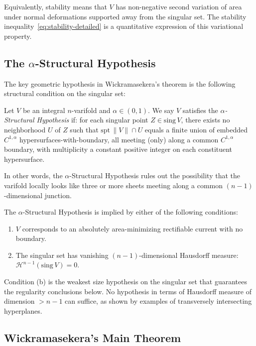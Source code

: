 Equivalently, stability means that $V$ has non-negative second variation of area under normal
deformations supported away from the singular set. The stability inequality~\eqref{eq:stability-detailed}
is a quantitative expression of this variational property.

\subsection{The $\alpha$-Structural Hypothesis}

The key geometric hypothesis in Wickramasekera's theorem is the following structural condition on
the singular set:

\begin{definition}\label{def:alpha-structural}
Let $V$ be an integral $n$-varifold and $\alpha \in (0,1)$. We say $V$ satisfies the
\emph{$\alpha$-Structural Hypothesis} if: for each singular point $Z \in \mathrm{sing}\, V$, there
exists no neighborhood $U$ of $Z$ such that $\mathrm{spt}\,\|V\| \cap U$ equals a finite union of
embedded $C^{1,\alpha}$ hypersurfaces-with-boundary, all meeting (only) along a common
$C^{1,\alpha}$ boundary, with multiplicity a constant positive integer on each constituent
hypersurface.
\end{definition}

In other words, the $\alpha$-Structural Hypothesis rules out the possibility that the varifold
locally looks like three or more sheets meeting along a common $(n-1)$-dimensional junction.

\begin{remark}
The $\alpha$-Structural Hypothesis is implied by either of the following conditions:
\begin{enumerate}[label=(\alph*)]
\item $V$ corresponds to an absolutely area-minimizing rectifiable current with no boundary.
\item The singular set has vanishing $(n-1)$-dimensional Hausdorff measure:
${\mathcal H}^{n-1}(\mathrm{sing}\, V) = 0$.
\end{enumerate}
Condition (b) is the weakest size hypothesis on the singular set that guarantees the regularity
conclusions below. No hypothesis in terms of Hausdorff measure of dimension $> n-1$ can suffice,
as shown by examples of transversely intersecting hyperplanes.
\end{remark}

\subsection{Wickramasekera's Main Theorem}

